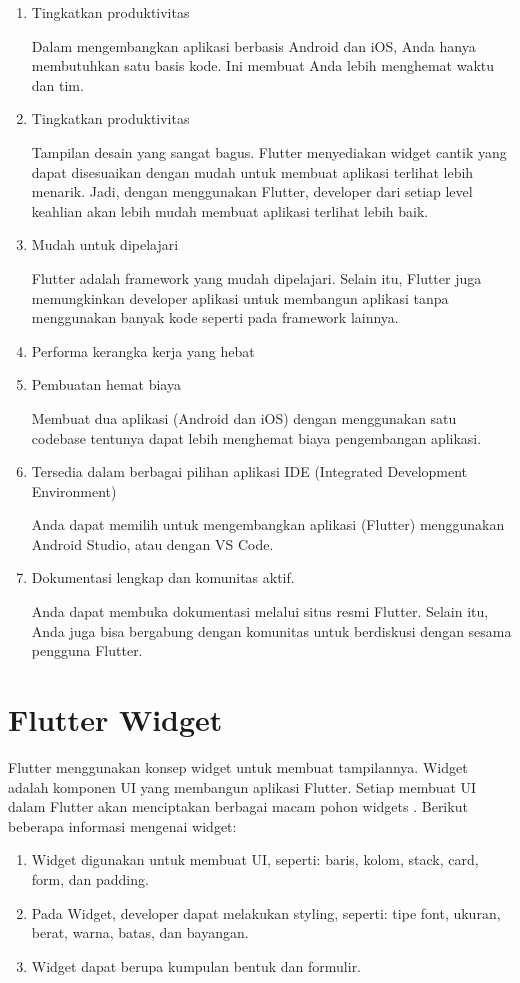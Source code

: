 \begin{enumerate}
	\item Tingkatkan produktivitas

	Dalam mengembangkan aplikasi berbasis Android dan iOS, Anda hanya membutuhkan satu basis kode. Ini membuat Anda lebih menghemat waktu dan tim.
	
	\item Tingkatkan produktivitas

	Tampilan desain yang sangat bagus. Flutter menyediakan widget cantik yang dapat disesuaikan dengan mudah untuk membuat aplikasi terlihat lebih menarik. Jadi, dengan menggunakan Flutter, developer dari setiap level keahlian akan lebih mudah membuat aplikasi terlihat lebih baik.

	\item Mudah untuk dipelajari

	Flutter adalah framework yang mudah dipelajari. Selain itu, Flutter juga memungkinkan developer aplikasi untuk membangun aplikasi tanpa menggunakan banyak kode seperti pada framework lainnya.

	\item Performa kerangka kerja yang hebat

	\item Pembuatan hemat biaya

	Membuat dua aplikasi (Android dan iOS) dengan menggunakan satu codebase tentunya dapat lebih menghemat biaya pengembangan aplikasi.

	\item Tersedia dalam berbagai pilihan aplikasi IDE (Integrated Development Environment)

	Anda dapat memilih untuk mengembangkan aplikasi (Flutter) menggunakan Android Studio, atau dengan VS Code.

	\item Dokumentasi lengkap dan komunitas aktif.

	Anda dapat membuka dokumentasi melalui situs resmi Flutter. Selain itu, Anda juga bisa bergabung dengan komunitas untuk berdiskusi dengan sesama pengguna Flutter.

\end{enumerate}


\section{Flutter Widget}

Flutter menggunakan konsep widget untuk membuat tampilannya. Widget adalah komponen UI yang membangun aplikasi Flutter. Setiap membuat UI dalam Flutter akan menciptakan berbagai macam pohon widgets . Berikut beberapa informasi mengenai widget:
\begin{enumerate}
	\item Widget digunakan untuk membuat UI, seperti: baris, kolom, stack, card, form, dan padding.
	\item Pada Widget, developer dapat melakukan styling, seperti: tipe font, ukuran, berat, warna, batas, dan bayangan. 
	\item Widget dapat berupa kumpulan bentuk dan formulir.
\end{enumerate}

